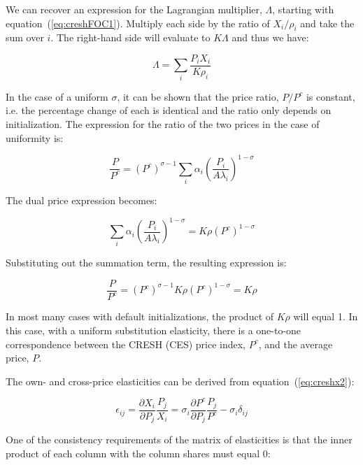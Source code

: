 We can recover an expression for the Lagrangian multiplier,
$\Lambda$, starting with equation~(\ref{eq:creshFOC1}). Multiply each side by
the ratio of $X_i/\rho_i$ and take the sum over $i$. The
right-hand side will evaluate to $K\Lambda$ and thus we have:

\begin{equation}
\label{eq:creshLM}
\Lambda=\sum_i{ \frac{P_i X_i}{K \rho_i}}
\end{equation}

In the case of a uniform $\sigma$, it can be shown that the price ratio,
$P/P^c$ is constant, i.e. the percentage change of each is identical
and the ratio only depends on initialization. The expression for
the ratio of the two prices in the case of uniformity is:

\begin{displaymath}
\frac{P}{P^c} = \left(P^c\right)^{\sigma-1} \sum_i{\alpha_i \left( \frac{P_i} {A \lambda_i} \right)^{1-\sigma}}
\end{displaymath}

\noindent The dual price expression becomes:

\begin{displaymath}
\sum\limits_{i} { \alpha_i \left( \frac {P_i} {A \lambda_i} \right)^{1-\sigma}} = K \rho \left(P^c\right)^{1 - \sigma}
\end{displaymath}

\noindent Substituting out the summation term, the resulting expression is:

\begin{displaymath}
\frac{P}{P^c} = \left(P^c\right)^{\sigma-1} K \rho \left(P^c\right)^{1 - \sigma}
= K \rho
\end{displaymath}

\noindent In most many cases with default initializations, the product of $K \rho$
will equal 1. In this case, with a uniform substitution elasticity, there
is a one-to-one correspondence between the CRESH (CES) price index, $P^c$,
and the average price, $P$.

The own- and cross-price elasticities can be derived from equation~(\ref{eq:creshx2}):

\begin{equation}
\label{eq:creshelas1}
\epsilon_{ij} = \frac {\partial{X_i}}{\partial{P_j}}\frac{P_j}{X_i}
= \sigma_i \frac {\partial{P^c}}{\partial{P_j}}\frac{P_j}{P^c} - \sigma_i\delta_{ij}
\end{equation}

One of the consistency requirements of the matrix of elasticities is that the inner product
of each column with the column shares must equal 0:

